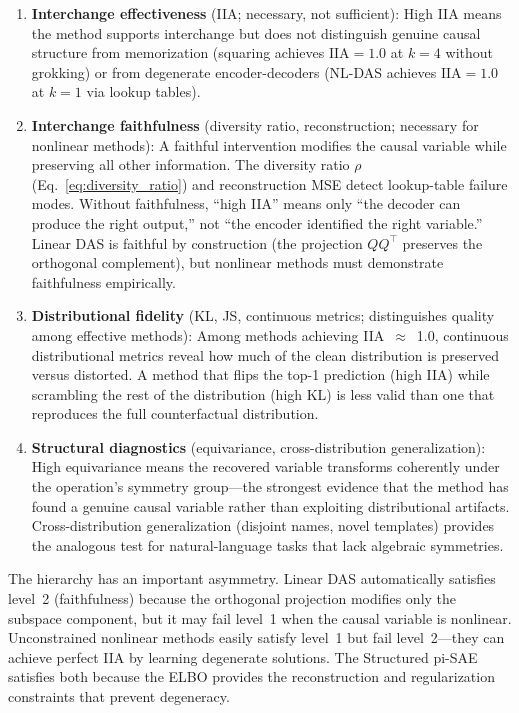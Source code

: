 \documentclass{article}
\newcommand{\IIA}{\mathrm{IIA}}
\begin{document}
\begin{enumerate}
\item \textbf{Interchange effectiveness} (IIA; necessary, not sufficient): High
  IIA means the method supports interchange but does not distinguish genuine
  causal structure from memorization (squaring achieves $\IIA = 1.0$ at $k = 4$
  without grokking) or from degenerate encoder-decoders (NL-DAS achieves
  $\IIA = 1.0$ at $k = 1$ via lookup tables).

\item \textbf{Interchange faithfulness} (diversity ratio, reconstruction;
  necessary for nonlinear methods): A faithful intervention modifies the causal
  variable while preserving all other information. The diversity ratio
  $\rho$ (Eq.~\ref{eq:diversity_ratio}) and reconstruction MSE detect
  lookup-table failure modes. Without faithfulness, ``high IIA'' means only
  ``the decoder can produce the right output,'' not ``the encoder identified
  the right variable.'' Linear DAS is faithful by construction (the projection
  $QQ^\top$ preserves the orthogonal complement), but nonlinear methods must
  demonstrate faithfulness empirically.

\item \textbf{Distributional fidelity} (KL, JS, continuous metrics;
  distinguishes quality among effective methods): Among methods achieving
  IIA~$\approx$~1.0, continuous distributional metrics reveal how much of
  the clean distribution is preserved versus distorted. A method that flips
  the top-1 prediction (high IIA) while scrambling the rest of the distribution
  (high KL) is less valid than one that reproduces the full counterfactual
  distribution.

\item \textbf{Structural diagnostics} (equivariance, cross-distribution
  generalization): High equivariance means the recovered variable transforms
  coherently under the operation's symmetry group---the strongest evidence that
  the method has found a genuine causal variable rather than exploiting
  distributional artifacts. Cross-distribution generalization (disjoint names,
  novel templates) provides the analogous test for natural-language tasks that
  lack algebraic symmetries.
\end{enumerate}

The hierarchy has an important asymmetry. Linear DAS automatically satisfies
level~2 (faithfulness) because the orthogonal projection modifies only the
subspace component, but it may fail level~1 when the causal variable is
nonlinear. Unconstrained nonlinear methods easily satisfy level~1 but fail
level~2---they can achieve perfect IIA by learning degenerate solutions. The
Structured pi-SAE satisfies both because the ELBO provides the reconstruction and
regularization constraints that prevent degeneracy.
\end{document}
